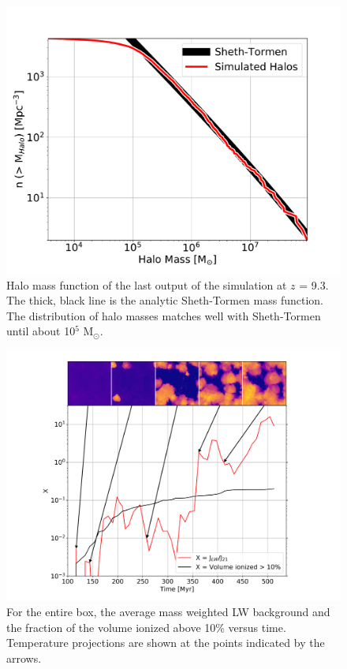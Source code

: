 \documentclass[a4paper,fleqn,usenatbib]{mnras}
\begin{document}
\begin{figure}
	\includegraphics[width=\columnwidth]{images/hmf.pdf}
    \caption{Halo mass function of the last output of the simulation at $z$ = 9.3. The thick, black line is the analytic Sheth-Tormen mass function. The distribution of halo masses matches well with Sheth-Tormen until about 10$^{5}$ M$_{\odot}$.}
    \label{fig:hmf}
\end{figure}

\begin{figure}
	\includegraphics[width=\columnwidth]{images/JLW_xe_mass.pdf}
    \caption{For the entire box, the average mass weighted LW background and the fraction of the volume ionized above 10\% versus time. Temperature projections are shown at the points indicated by the arrows.}
    \label{fig:JLW_xe_mass}
\end{figure}
\end{document}
